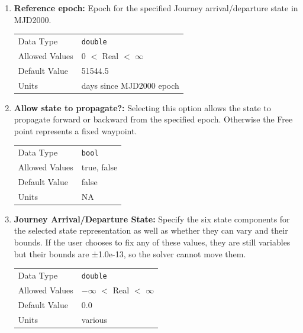 \begin{enumerate}
    \item \textbf{Reference epoch:} Epoch for the specified Journey arrival/departure state in MJD2000.
    
        \begin{table}[H]
            \hspace{2cm}
            \begin{tabular}{ll}
            Data Type & \verb|double| \\
            Allowed Values & $0$ $<$ Real $<$ $\infty$ \\
            Default Value & 51544.5\\
            Units & days since MJD2000 epoch
            \end{tabular}
        \end{table}

    \item \textbf{Allow state to propagate?:} Selecting this option allows the state to propagate forward or backward from the specified epoch. Otherwise the Free point represents a fixed waypoint.

        \begin{table}[H]
            \hspace{2cm}
            \begin{tabular}{ll}
            Data Type & \verb|bool| \\
            Allowed Values & true, false \\
            Default Value & false \\
            Units & NA
            \end{tabular}
        \end{table}

    \item \textbf{Journey Arrival/Departure State:} Specify the six state components for the selected state representation as well as whether they can vary and their bounds. If the user chooses to fix any of these values, they are still variables but their bounds are ±1.0e-13, so the solver cannot move them.
    
        \begin{table}[H]
            \hspace{2cm}
            \begin{tabular}{ll}
            Data Type & \verb|double| \\
            Allowed Values & $-\infty$ $<$ Real $<$ $\infty$ \\
            Default Value & 0.0\\
            Units & various
            \end{tabular}
        \end{table}

\end{enumerate}

